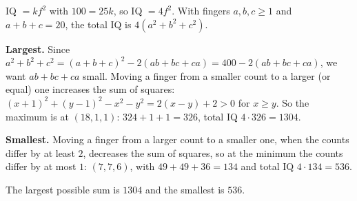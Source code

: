 IQ $=kf^2$ with $100=25k$, so IQ $=4f^2$. With fingers $a,b,c\ge1$ and $a+b+c=20$, the total IQ is $4\left(a^2+b^2+c^2\right)$.

\textbf{Largest.} Since $a^2+b^2+c^2=(a+b+c)^2-2(ab+bc+ca)=400-2(ab+bc+ca)$, we want $ab+bc+ca$ small. Moving a finger from a smaller count to a larger (or equal) one increases the sum of squares: $(x+1)^2+(y-1)^2-x^2-y^2=2(x-y)+2>0$ for $x\ge y$. So the maximum is at $(18,1,1)$: $324+1+1=326$, total IQ $4\cdot326=1304$.

\textbf{Smallest.} Moving a finger from a larger count to a smaller one, when the counts differ by at least $2$, decreases the sum of squares, so at the minimum the counts differ by at most $1$: $(7,7,6)$, with $49+49+36=134$ and total IQ $4\cdot134=536$.

The largest possible sum is $\boxed{1304}$ and the smallest is $\boxed{536}$.
